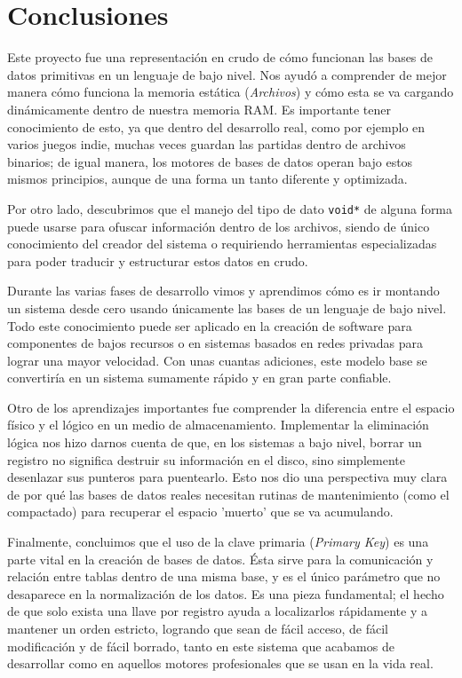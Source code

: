 \documentclass[12pt]{article}
\begin{document}
\newpage
\section{Conclusiones}
Este proyecto fue una representación en crudo de cómo funcionan 
las bases de datos primitivas en un lenguaje de bajo nivel. 
Nos ayudó a comprender de mejor manera cómo funciona la memoria 
estática (\textit{Archivos}) y cómo esta se va cargando 
dinámicamente dentro de nuestra memoria RAM. 
Es importante tener conocimiento de esto, ya que dentro del 
desarrollo real, como por ejemplo en varios juegos indie, 
muchas veces guardan las partidas dentro de archivos binarios; 
de igual manera, los motores de bases de datos operan bajo estos 
mismos principios, aunque de una forma un tanto diferente y 
optimizada.

Por otro lado, descubrimos que el manejo del tipo de dato 
\verb|void*| de alguna forma puede usarse para ofuscar 
información dentro de los archivos, siendo de único conocimiento 
del creador del sistema o requiriendo herramientas especializadas 
para poder traducir y estructurar estos datos en crudo.

Durante las varias fases de desarrollo vimos y aprendimos cómo 
es ir montando un sistema desde cero usando únicamente las bases 
de un lenguaje de bajo nivel. Todo este conocimiento puede ser 
aplicado en la creación de software para componentes de bajos 
recursos o en sistemas basados en redes privadas para lograr una 
mayor velocidad. Con unas cuantas adiciones, este modelo base 
se convertiría en un sistema sumamente rápido y en gran parte 
confiable.

Otro de los aprendizajes importantes fue comprender la diferencia 
entre el espacio físico y el lógico en un medio de almacenamiento. 
Implementar la eliminación lógica nos hizo darnos cuenta de que, 
en los sistemas a bajo nivel, borrar un registro no significa 
destruir su información en el disco, sino simplemente desenlazar 
sus punteros para puentearlo. Esto nos dio una perspectiva muy 
clara de por qué las bases de datos reales necesitan rutinas de 
mantenimiento (como el compactado) para recuperar el espacio 
'muerto' que se va acumulando.

Finalmente, concluimos que el uso de la clave primaria 
(\textit{Primary Key}) es una parte vital en la creación de 
bases de datos. Ésta sirve para la comunicación y relación entre 
tablas dentro de una misma base, y es el único parámetro que no 
desaparece en la normalización de los datos. Es una pieza 
fundamental; el hecho de que solo exista una llave por registro 
ayuda a localizarlos rápidamente y a mantener un orden estricto, 
logrando que sean de fácil acceso, de fácil modificación y de 
fácil borrado, tanto en este sistema que acabamos de desarrollar 
como en aquellos motores profesionales que se usan en la vida real.
\end{document}
